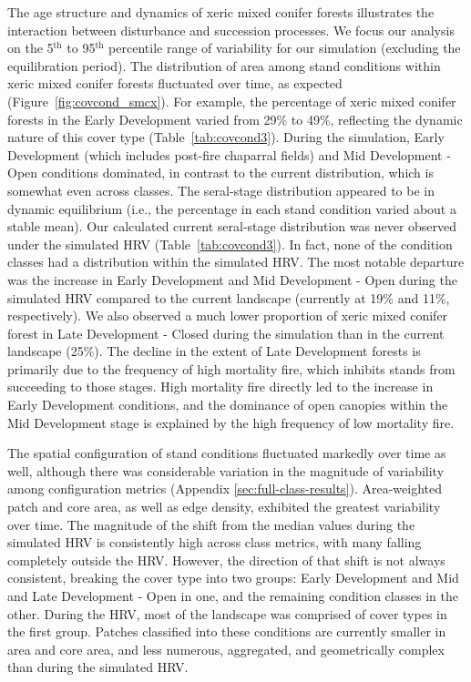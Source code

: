 The age structure and dynamics of xeric mixed conifer forests illustrates the interaction between disturbance and succession processes. We focus our analysis on the 5$^{\text{th}}$ to 95$^{\text{th}}$ percentile range of variability for our simulation (excluding the equilibration period). %
%
The distribution of area among stand conditions within xeric mixed conifer forests fluctuated over time, as expected (Figure~\ref{fig:covcond_smcx}). For example, the percentage of xeric mixed conifer forests in the Early Development varied from 29\% to 49\%, reflecting the dynamic nature of this cover type (Table~\ref{tab:covcond3}). During the simulation, Early Development (which includes post-fire chaparral fields) and Mid Development - Open conditions dominated, in contrast to the current distribution, which is somewhat even across classes.  %
%
The seral-stage distribution appeared to be in dynamic equilibrium (i.e., the percentage in each stand condition varied about a stable mean). Our calculated current seral-stage distribution was never observed under the simulated HRV (Table~\ref{tab:covcond3}). In fact, none of the condition classes had a distribution within the simulated HRV. The most notable departure was the increase in Early Development and Mid Development - Open during the simulated HRV compared to the current landscape (currently at 19\% and 11\%, respectively). We also observed a much lower proportion of xeric mixed conifer forest in Late Development - Closed during the simulation than in the current landscape (25\%). The decline in the extent of Late Development forests is primarily due to the frequency of high mortality fire, which inhibits stands from succeeding to those stages. High mortality fire directly led to the increase in Early Development conditions, and the dominance of open canopies within the Mid Development stage is explained by the high frequency of low mortality fire.

The spatial configuration of stand conditions fluctuated markedly over time as well, although there was considerable variation in the magnitude of variability among configuration metrics (Appendix \ref{sec:full-class-results}). Area-weighted patch and core area, as well as edge density, exhibited the greatest variability over time. The magnitude of the shift from the median values during the simulated HRV is consistently high across class metrics, with many falling completely outside the HRV. However, the direction of that shift is not always consistent, breaking the cover type into two groups: Early Development and Mid and Late Development - Open in one, and the remaining condition classes in the other. During the HRV, most of the landscape was comprised of cover types in the first group. Patches classified into these conditions are currently smaller in area and core area, and less numerous, aggregated, and geometrically complex than during the simulated HRV.


